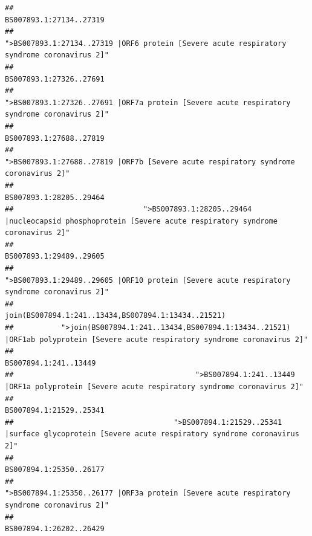 \documentclass[
]{article}
\begin{document}
\begin{verbatim}
##                                                                                                                BS007893.1:27134..27319 
##                                             ">BS007893.1:27134..27319 |ORF6 protein [Severe acute respiratory syndrome coronavirus 2]" 
##                                                                                                                BS007893.1:27326..27691 
##                                            ">BS007893.1:27326..27691 |ORF7a protein [Severe acute respiratory syndrome coronavirus 2]" 
##                                                                                                                BS007893.1:27688..27819 
##                                                    ">BS007893.1:27688..27819 |ORF7b [Severe acute respiratory syndrome coronavirus 2]" 
##                                                                                                                BS007893.1:28205..29464 
##                              ">BS007893.1:28205..29464 |nucleocapsid phosphoprotein [Severe acute respiratory syndrome coronavirus 2]" 
##                                                                                                                BS007893.1:29489..29605 
##                                            ">BS007893.1:29489..29605 |ORF10 protein [Severe acute respiratory syndrome coronavirus 2]" 
##                                                                                    join(BS007894.1:241..13434,BS007894.1:13434..21521) 
##           ">join(BS007894.1:241..13434,BS007894.1:13434..21521) |ORF1ab polyprotein [Severe acute respiratory syndrome coronavirus 2]" 
##                                                                                                                  BS007894.1:241..13449 
##                                          ">BS007894.1:241..13449 |ORF1a polyprotein [Severe acute respiratory syndrome coronavirus 2]" 
##                                                                                                                BS007894.1:21529..25341 
##                                     ">BS007894.1:21529..25341 |surface glycoprotein [Severe acute respiratory syndrome coronavirus 2]" 
##                                                                                                                BS007894.1:25350..26177 
##                                            ">BS007894.1:25350..26177 |ORF3a protein [Severe acute respiratory syndrome coronavirus 2]" 
##                                                                                                                BS007894.1:26202..26429 

\end{verbatim}
\end{document}
